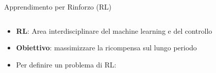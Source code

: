 \documentclass[]{beamer}
\begin{document}
\begin{frame}{Apprendimento per Rinforzo (RL)}
    \begin{columns}
        \begin{column}{.7\textwidth}
            \begin{itemize}
                \item \textbf{RL}: Area interdisciplinare del machine learning e del controllo

                \medskip

                \item \textbf{Obiettivo}: massimizzare la ricompensa sul lungo periodo

                \medskip

                \item Per definire un problema di RL:


\end{itemize}
\end{column}
\end{columns}
\end{frame}
\end{document}
